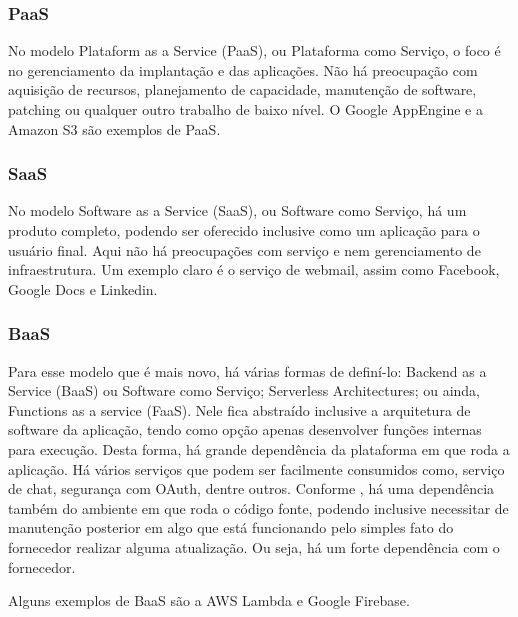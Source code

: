 
\subsubsection{PaaS}\label{paas}

No modelo Plataform as a Service (PaaS), ou Plataforma como Serviço,
o foco é no gerenciamento da implantação e das aplicações.
Não há preocupação com aquisição de recursos, planejamento de capacidade,
manutenção de software, patching ou qualquer outro trabalho de baixo nível.
O Google AppEngine e a Amazon S3 são exemplos de PaaS.

\subsubsection{SaaS}\label{saas}

No modelo Software as a Service (SaaS), ou Software como Serviço,
há um produto completo, podendo ser oferecido inclusive como um aplicação
para o usuário final.
Aqui não há preocupações com serviço e nem gerenciamento de infraestrutura.
Um exemplo claro é o serviço de webmail, assim como Facebook,
Google Docs e Linkedin.

\subsubsection{BaaS}\label{baas}

Para esse modelo que é mais novo, há várias formas de definí-lo:
Backend as a Service (BaaS) ou Software como Serviço; Serverless Architectures; ou ainda,
Functions as a service (FaaS).
Nele fica abstraído inclusive a arquitetura de software da aplicação,
tendo como opção apenas desenvolver funções internas para execução. Desta forma, há grande
dependência da plataforma em que roda a aplicação.
Há vários serviços que podem ser facilmente consumidos como, serviço de chat, segurança com
OAuth, dentre outros.
Conforme \cite{martin-serverless}, há uma dependência também do ambiente em que roda o
código fonte, podendo inclusive necessitar de manutenção posterior em algo que está
funcionando pelo simples fato do fornecedor realizar alguma atualização.
Ou seja, há um forte dependência com o fornecedor.

Alguns exemplos de BaaS são a AWS Lambda e Google Firebase.

